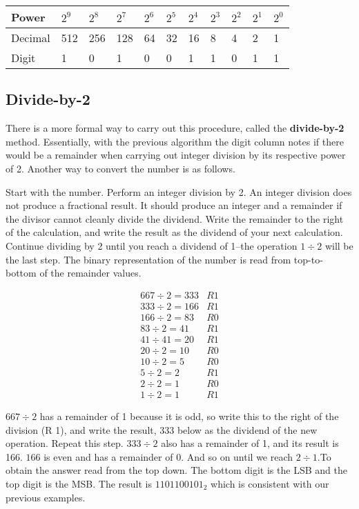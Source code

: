 \vspace{1em} %
\begin{tabular}{|l|l|l|l|l|l|l|l|l|l|l|}\hline
Power & $2^9$ & $2^8$ & $2^7$ & $2^6$ & $2^5$ & $2^4$ & $2^3$ & $2^2$ & $2^1$ & $2^0$ \\\hline\hline
Decimal & 512 & 256 & 128 & 64 & 32 & 16 & 8 & 4 & 2 & 1 \\\hline
Digit & 1 & 0 & 1 & 0 & 0 & 1 & 1 & 0 & 1 & 1 \\\hline
\end{tabular}
\vspace{1em}

\subsection{Divide-by-2\label{sec:numbers:divideby2}}

There is a more formal way to carry out this procedure, called the \textbf{divide-by-2} method. Essentially, with the previous 
algorithm the digit column notes if there would be a remainder when carrying out integer division by its respective power of 2. 
Another way to convert the number is as follows.

Start with the number. Perform an integer division by 2. An integer division does not produce a fractional result. It should produce an integer and a remainder if the divisor cannot cleanly divide the dividend. Write the remainder to the right of the calculation, and write the result as the dividend of your next calculation. Continue dividing by 2 until you reach a dividend of 1--the operation $1 \div 2$ will be the last step. The binary representation of the number is read from top-to-bottom of the remainder values.

\begin{align*}
	667 \div 2 = 333  	& R 1 \\
	333 \div 2 = 166 	& R 1 \\
	166 \div 2 = 83 	& R 0 \\
	83  \div 2 = 41 	& R 1 \\
	41	\div 41 = 20 	& R 1 \\
	20 \div 2 = 10 		& R 0 \\
	10 \div 2 = 5 		& R 0 \\
	5 \div 2 = 2 		& R 1 \\
	2 \div 2 = 1 		& R 0 \\
	1 \div 2 = 1		& R 1
\end{align*}

$667 \div 2$ has a remainder of 1 because it is odd, so write this to the right of the division (R 1), and write the result, $333$ below as the dividend of the new operation. Repeat this step. $333 \div 2$ also has a remainder of 1, and its result is 166. $166$ is even and has a remainder of 0. And so on until we reach $2 \div 1$.To obtain the answer read from the top down. The bottom digit is the LSB and the top digit is the MSB. The result is $1101100101_2$ which is consistent with our previous examples.

